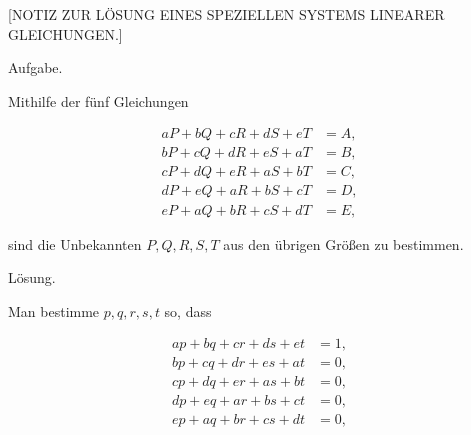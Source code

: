 \clearpage
{}

\begin{center}
\large [NOTIZ ZUR LÖSUNG EINES SPEZIELLEN SYSTEMS
LINEARER GLEICHUNGEN.]
\end{center}

\begin{center}
Aufgabe.
\end{center}

\noindent\hspace*{\parindent}Mithilfe der fünf Gleichungen

\[
\begin{aligned}
aP + bQ + cR + dS + eT &= A,\\[3pt]
bP + cQ + dR + eS + aT &= B,\\[3pt]
cP + dQ + eR + aS + bT &= C,\\[3pt]
dP + eQ + aR + bS + cT &= D,\\[3pt]
eP + aQ + bR + cS + dT &= E,
\end{aligned}
\]

\noindent sind die Unbekannten $P, Q, R, S, T$ aus den übrigen Größen zu bestimmen.

\begin{center}
Lösung.
\end{center}

\noindent\hspace*{\parindent}Man bestimme $p, q, r, s, t$ so, dass

\[
\begin{aligned}
ap + bq + cr + ds + et &= 1,\\[3pt]
bp + cq + dr + es + at &= 0,\\[3pt]
cp + dq + er + as + bt &= 0,\\[3pt]
dp + eq + ar + bs + ct &= 0,\\[3pt]
ep + aq + br + cs + dt &= 0,
\end{aligned}
\]

